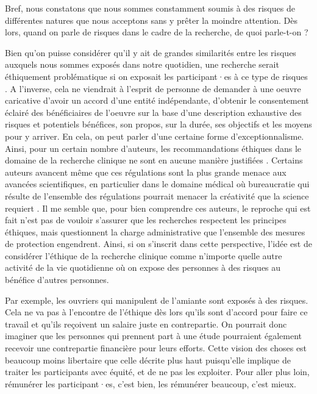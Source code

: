 \documentclass[
  12pt,
]{book}
\begin{document}
Bref, nous constatons que nous sommes constamment soumis à des risques de différentes natures que nous acceptons sans y prêter la moindre attention. Dès lors, quand on parle de risques dans le cadre de la recherche, de quoi parle-t-on ?

Bien qu'on puisse considérer qu'il y ait de grandes similarités entre les risques auxquels nous sommes exposés dans notre quotidien, une recherche serait éthiquement problématique si on exposait les participant·es à ce type de risques \citep{Wilson2010}. A l'inverse, cela ne viendrait à l'esprit de personne de demander à une oeuvre caricative d'avoir un accord d'une entité indépendante, d'obtenir le consentement éclairé des bénéficiaires de l'oeuvre sur la base d'une description exhaustive des risques et potentiels bénéfices, son propos, sur la durée, ses objectifs et les moyens pour y arriver. En cela, on peut parler d'une certaine forme d'exceptionnalisme. Ainsi, pour un certain nombre d'auteurs, les recommandations éthiques dans le domaine de la recherche clinique ne sont en aucune manière justifiées \citep{Sachs2009, Wertheimer2010}. Certains auteurs avancent même que ces régulations sont la plus grande menace aux avancées scientifiques, en particulier dans le domaine médical \citep{Stewart2008} où bureaucratie qui résulte de l'ensemble des régulations pourrait menacer la créativité que la science requiert \citep{Sullivan2008}. Il me semble que, pour bien comprendre ces auteurs, le reproche qui est fait n'est pas de vouloir s'assurer que les recherches respectent les principes éthiques, mais questionnent la charge administrative que l'ensemble des mesures de protection engendrent. Ainsi, si on s'inscrit dans cette perspective, l'idée est de considérer l'éthique de la recherche clinique comme n'importe quelle autre activité de la vie quotidienne où on expose des personnes à des risques au bénéfice d'autres personnes.

Par exemple, les ouvriers qui manipulent de l'amiante sont exposés à des risques. Cela ne va pas à l'encontre de l'éthique dès lors qu'ils sont d'accord pour faire ce travail et qu'ils reçoivent un salaire juste en contrepartie. On pourrait donc imaginer que les personnes qui prennent part à une étude pourraient également recevoir une contrepartie financière pour leurs efforts. Cette vision des choses est beaucoup moins libertaire que celle décrite plus haut puisqu'elle implique de traiter les participants avec équité, et de ne pas les exploiter. Pour aller plus loin, rémunérer les participant·es, c'est bien, les rémunérer beaucoup, c'est mieux.
\end{document}
